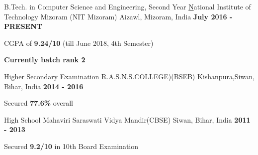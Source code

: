 \begin{cventries}
  \cventry
    {B.Tech. in Computer Science and Engineering, Second Year}
    {\href{http://nitmz.ac.in/} National Institute of Technology Mizoram (NIT Mizoram)}
    {Aizawl, Mizoram, India}
    {\textbf{July 2016 - PRESENT}}
    {
      \begin{cvitems}
        \item {CGPA of \textbf{9.24/10} (till June 2018, 4th    Semester)}
        \item {\textbf{Currently batch rank 2}}
      \end{cvitems}
    }
\cventry
    {Higher Secondary Examination}
    {R.A.S.N.S.COLLEGE)(BSEB)}
    {Kishanpura,Siwan, Bihar, India}
    {\textbf{2014 - 2016}}
    {
      \begin{cvitems}
        \item {Secured \textbf{77.6\%} overall}
      \end{cvitems}
    }
 \cventry
    {High School}
    {Mahaviri Saraswati Vidya Mandir(CBSE)}
    {Siwan, Bihar, India}
    {\textbf{2011 - 2013}}
    {
      \begin{cvitems}
        \item {Secured \textbf{9.2/10} in 10th Board Examination}
      \end{cvitems}
    }
\end{cventries}